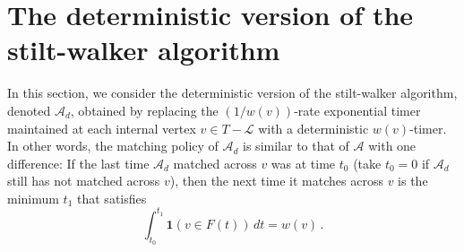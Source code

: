 \documentclass[11pt]{article}
\def\LongVersion{}
\theoremstyle{definition}
\theoremstyle{plain}
\theoremstyle{definition}
\theoremstyle{plain}
\theoremstyle{definition}
\theoremstyle{plain}
\newcommand{\Leaves}{\mathcal{L}}
\newcommand{\Indicator}{\mathbf{1}}
\newcommand{\Effective}{\mathit{F}}
\newcommand{\A}{\mathcal{A}}
\begin{document}
\LongVersion %
\section{The deterministic version of the stilt-walker algorithm}
\label{section:specific-lower-bound}
In this section, we consider the deterministic version of the stilt-walker
algorithm, denoted $\A_{d}$, obtained by replacing the $(1 / w(v))$-rate
exponential timer maintained at each internal vertex $v \in T - \Leaves$ with
a deterministic $w(v)$-timer.
In other words, the matching policy of $\A_{d}$ is similar to that of $\A$
with one difference:
If the last time $\A_{d}$ matched across $v$ was at time $t_{0}$
(take $t_{0} = 0$ if $\A_{d}$ still has not matched across $v$), then the next
time it matches across $v$ is the minimum $t_{1}$ that satisfies
\[
\int_{t_{0}}^{t_{1}} \Indicator(v \in \Effective(t)) \, d t
=
w(v) \, .
\]
\end{document}
